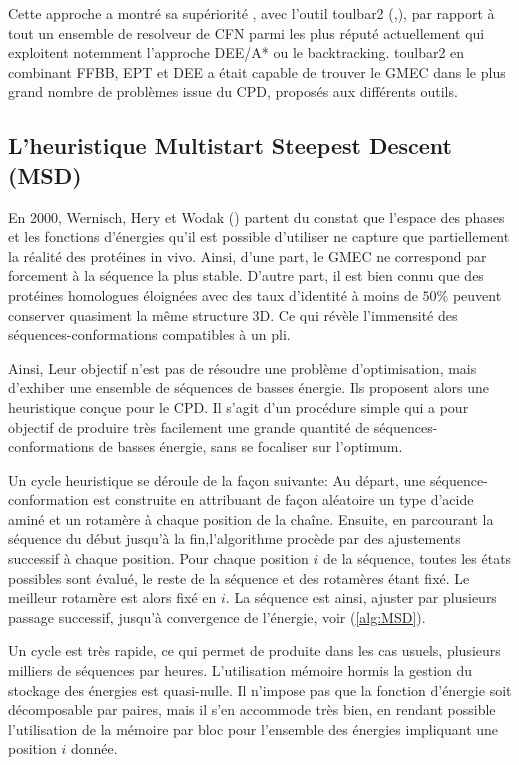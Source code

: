 Cette approche a montré sa supériorité , avec l'outil toulbar2 (\cite{Allouche14},\cite{Traoré13}), par rapport à tout un ensemble de resolveur de CFN parmi les plus réputé actuellement qui exploitent notemment l'approche DEE/A* ou le backtracking. toulbar2 en combinant FFBB, EPT et DEE a était capable de trouver le GMEC dans le plus grand nombre de problèmes issue du CPD, proposés aux différents outils.
\subsection{L'heuristique Multistart Steepest Descent (MSD)}

En 2000, Wernisch, Hery et Wodak  (\cite{Wernisch00}) partent du constat que l'espace des phases et les fonctions d'énergies qu'il est possible d'utiliser ne capture que partiellement la réalité des protéines in vivo. Ainsi, d'une part, le GMEC ne correspond par forcement à la séquence la plus stable. D'autre part, il est bien connu que des protéines homologues éloignées avec des taux d'identité à moins de $50\%$ peuvent conserver quasiment la même structure 3D. Ce qui révèle l'immensité des séquences-conformations compatibles à un pli.

Ainsi, Leur objectif n'est pas de résoudre une problème d'optimisation, mais d'exhiber une ensemble de séquences de basses énergie. Ils proposent alors une heuristique conçue pour le CPD. Il s'agit d'un procédure simple qui a pour objectif de produire très facilement une grande quantité de séquences-conformations de basses énergie, sans se focaliser sur l'optimum.

Un cycle heuristique se déroule de la façon suivante:
Au départ, une séquence-conformation est construite en attribuant de façon aléatoire un type d'acide aminé et un rotamère à chaque position de la chaîne. Ensuite, en parcourant la séquence du début jusqu'à la fin,l'algorithme procède par des ajustements successif à chaque position. Pour chaque position $i$ de la séquence, toutes les états possibles sont évalué, le reste de la séquence et des rotamères étant fixé. Le meilleur rotamère est alors fixé en $i$. La séquence est ainsi, ajuster par plusieurs passage successif, jusqu'à convergence de l'énergie, voir (\ref{alg:MSD}).

Un cycle est très rapide, ce qui permet de produite dans les cas usuels, plusieurs milliers de séquences par heures. L'utilisation mémoire hormis la gestion du stockage des énergies est quasi-nulle. Il n'impose pas que la fonction d'énergie soit décomposable par paires, mais il s'en accommode très bien, en rendant possible l'utilisation de la mémoire par bloc pour l'ensemble des énergies impliquant une position $i$ donnée.

